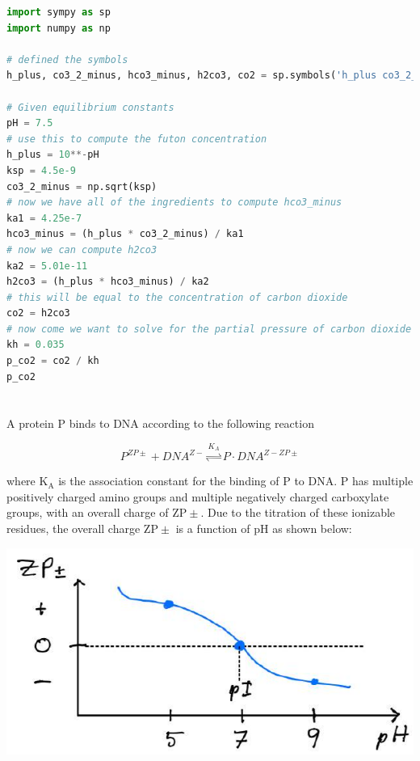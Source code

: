 \documentclass[12pt]{article}
\begin{document}
\begin{lstlisting}[language=Python]
import sympy as sp
import numpy as np

# defined the symbols
h_plus, co3_2_minus, hco3_minus, h2co3, co2 = sp.symbols('h_plus co3_2_minus hco3_minus h2co3 co2')

# Given equilibrium constants
pH = 7.5
# use this to compute the futon concentration
h_plus = 10**-pH
ksp = 4.5e-9
co3_2_minus = np.sqrt(ksp)
# now we have all of the ingredients to compute hco3_minus
ka1 = 4.25e-7
hco3_minus = (h_plus * co3_2_minus) / ka1
# now we can compute h2co3
ka2 = 5.01e-11
h2co3 = (h_plus * hco3_minus) / ka2
# this will be equal to the concentration of carbon dioxide
co2 = h2co3
# now come we want to solve for the partial pressure of carbon dioxide using henry's law
kh = 0.035
p_co2 = co2 / kh
p_co2
\end{lstlisting}


\section{}
A protein $\mathrm{P}$ binds to DNA according to the following reaction

$$
P^{Z P \pm}+D N A^{Z-} \stackrel{K_{A}}{\rightleftharpoons} P \cdot D N A^{Z-Z P \pm}
$$

where $\mathrm{K}_{\mathrm{A}}$ is the association constant for the binding of $\mathrm{P}$ to DNA. $\mathrm{P}$ has multiple positively charged amino groups and multiple negatively charged carboxylate groups, with an overall charge of $\mathrm{ZP} \pm$. Due to the titration of these ionizable residues, the overall charge $\mathrm{ZP} \pm$ is a function of $\mathrm{pH}$ as shown below:

\begin{center}
\includegraphics[max width=\textwidth]{2024_05_17_4f752ecd7e7a86925d15g-1}
\end{center}
\end{document}
